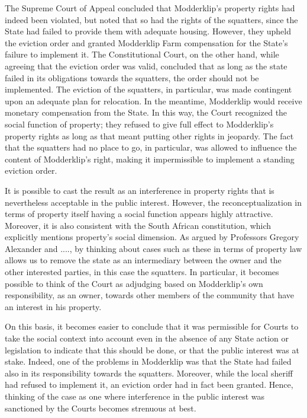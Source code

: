 The Supreme Court of Appeal concluded that Modderklip's property rights had indeed been violated, but noted that so had the rights of the squatters, since the State had failed to provide them with adequate housing. However, they upheld the eviction order and granted Modderklip Farm compensation for the State's failure to implement it. The Constitutional Court, on the other hand, while agreeing that the eviction order was valid, concluded that as long as the state failed in its obligations towards the squatters, the order should not be implemented. The eviction of the squatters, in particular, was made contingent upon an adequate plan for relocation. In the meantime, Modderklip would receive monetary compensation from the State. In this way, the Court recognized the social function of property; they refused to give full effect to Modderklip's property rights as long as that meant putting other rights in jeopardy. The fact that the squatters had no place to go, in particular, was allowed to influence the content of Modderklip's right, making it impermissible to implement a standing eviction order. 

It is possible to cast the result as an interference in property rights that is nevertheless acceptable in the public interest. However, the reconceptualization in terms of property itself having a social function appears highly attractive. Moreover, it is also consistent with the South African constitution, which explicitly mentions property's social dimension. As argued by Professors Gregory Alexander and ...., by thinking about cases such as these in terms of property law allows us to remove the state as an intermediary between the owner and the other interested parties, in this case the squatters. In particular, it becomes possible to think of the Court as adjudging based on Modderklip's own responsibility, as an owner, towards other members of the community that have an interest in his property. 

On this basis, it becomes easier to conclude that it was permissible for Courts to take the social context into account even in the absence of any State action or legislation to indicate that this should be done, or that the public interest was at stake. Indeed, one of the problems in Modderklip was that the State had failed also in its responsibility towards the squatters. Moreover, while the local sheriff had refused to implement it, an eviction order had in fact been granted. Hence, thinking of the case as one where interference in the public interest was sanctioned by the Courts becomes strenuous at best.

